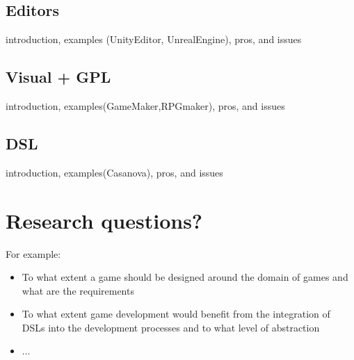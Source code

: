 \documentclass[10pt,a4paper]{article}
\begin{document}
\subsection{Editors} introduction, examples (UnityEditor, UnrealEngine), pros, and issues
\subsection{Visual + GPL} introduction, examples(GameMaker,RPGmaker), pros, and issues
\subsection{DSL} introduction, examples(Casanova), pros, and issues

\section{Research questions?}
For example: 
\begin{itemize}
\item To what extent a game should be designed around the domain of games and what are the requirements
\item To what extent game development would benefit from the integration of DSLs into the development processes and to what level of abstraction
\item ...
\end{itemize}
\end{document}
